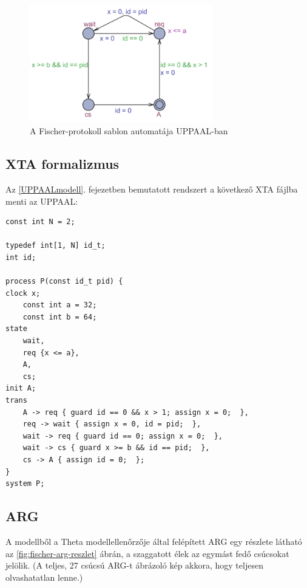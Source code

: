 \begin{figure}%
    \centering
    \includegraphics[width=80mm, keepaspectratio]{src/figures/fischer-uppaal.png}
    \caption{A Fischer-protokoll sablon automatája UPPAAL-ban}
    \label{fig:fischer-uppaal}
\end{figure}

\subsection{XTA formalizmus}
Az \ref{UPPAALmodell}. fejezetben bemutatott rendszert a következő XTA fájlba menti az UPPAAL:

\begin{verbatim}
const int N = 2;

typedef int[1, N] id_t;
int id;

process P(const id_t pid) {
clock x;
	const int a = 32;
	const int b = 64;
state
    wait,
    req {x <= a},
    A,
    cs;
init A;
trans
    A -> req { guard id == 0 && x > 1; assign x = 0;  },
    req -> wait { assign x = 0, id = pid;  },
    wait -> req { guard id == 0; assign x = 0;  },
    wait -> cs { guard x >= b && id == pid;  },
    cs -> A { assign id = 0;  };
}
system P;
\end{verbatim}

\subsection{ARG}
A modellből a Theta modellellenőrzője által felépített ARG egy részlete látható az \ref{fig:fischer-arg-reszlet} ábrán, a szaggatott élek az egymást fedő csúcsokat jelölik. (A teljes, 27 csúcsú ARG-t ábrázoló kép akkora, hogy teljesen olvashatatlan lenne.)

